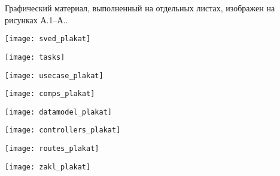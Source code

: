 
Графический материал, выполненный на отдельных листах,
изображен на рисунках А.1--А..
\setcounter{числоПлакатов}{0}

\renewcommand{\thefigure}{А.\arabic{figure}} %

\begin{landscape}

\begin{плакат}
    \texttt{[image: sved\_plakat]}
    \label{sved_plakat:image}      
\end{плакат}

\begin{плакат}
    \texttt{[image: tasks]}
    \label{tasks:image}      
\end{плакат}

\begin{плакат}
    \texttt{[image: usecase\_plakat]}
    \label{uscase_plakat:image}      
\end{плакат}

\begin{плакат}
    \texttt{[image: comps\_plakat]}
    \label{comps_plaket:image}      
\end{плакат}

\begin{плакат}
	\texttt{[image: datamodel\_plakat]}
	\label{datamodel_plakat:image}      
\end{плакат}

\begin{плакат}
	\texttt{[image: controllers\_plakat]}
	\label{controllers_plakat:image}      
\end{плакат}

\begin{плакат}
	\texttt{[image: routes\_plakat]}
	\label{routes_plakat:image}      
\end{плакат}

\begin{плакат}
	\texttt{[image: zakl\_plakat]}
	\label{zakl_plakat}      
\end{плакат}

\end{landscape}

